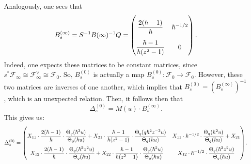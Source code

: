 \documentclass[a4paper]{report}
\theoremstyle{theorem}
\theoremstyle{definition}
\theoremstyle{remark}
\theoremstyle{proposition}
\theoremstyle{conjecture}
\theoremstyle{lemma}
\theoremstyle{corollary}
\theoremstyle{exercise}
\theoremstyle{example}
\newcommand{\mcal}{\mathcal}
\begin{document}
  Analogously, one sees that 
  \begin{equation}\label{eqn_Bsinfty}
      B_s^{(\infty)} = S^{-1} B(\infty)^{-1} Q = \renewcommand\arraystretch{2.5}\begin{pmatrix}
          \displaystyle\frac{2(\hbar - 1)}{\hbar} & \hbar^{-1/2}\\ 
          \displaystyle\frac{\hbar - 1}{\hbar(z^2-1)} & 0
  \end{pmatrix}.
  \end{equation}
  Indeed, one expects these matrices to be constant matrices, since $s^\ast\mcal{F}_\infty \cong \mcal{F}_\infty^\vee \cong \mcal{F}_0$.
  So, $B_s^{(0)}$ is actually a map $B_s^{(0)} : \mcal{F}_0 \to \mcal{F}_0$.
  However, these two matrices are inverses of one another, which implies that $B_s^{(0)} = \left(B_s^{(\infty)}\right)^{-1}$, 
  which is an unexpected relation.
  Then, it follows then that 
  \begin{equation}\label{eqn_deltas0}
      \Delta_s^{(0)} = M(u) \cdot B_s^{(\infty)}.
  \end{equation}
  This gives us:
  $$\Delta_s^{(0)} = \renewcommand\arraystretch{2.5}\begin{pmatrix}
      X_{11} \cdot \displaystyle\frac{2(\hbar - 1)}{\hbar} \cdot \frac{\Theta_q(\hbar^2u)}{\Theta_q(\hbar u)} + X_{21} \cdot \frac{\hbar - 1}{\hbar(z^2-1)} \cdot \frac{\Theta_q(q\hbar^2 z^{-2}u)}{\Theta_q(\hbar u)} & X_{11} \cdot \hbar^{-1/2} \cdot \displaystyle\frac{\Theta_q(\hbar^2u)}{\Theta_q(\hbar u)} + X_{21}\\
      X_{12} \cdot \displaystyle\frac{2(\hbar - 1)}{\hbar} \cdot \frac{\Theta_q(\hbar^2z^2u)}{\Theta_q(\hbar u)} + X_{22} \cdot \frac{\hbar-1}{\hbar(z^2-1)} \cdot \frac{\Theta_q(\hbar^2u)}{\Theta_q(\hbar u)} & X_{12} \cdot \hbar^{-1/2} \cdot \displaystyle\frac{\Theta_q(\hbar^2z^2u)}{\Theta_q(\hbar u)}
  \end{pmatrix}.$$
\end{document}
